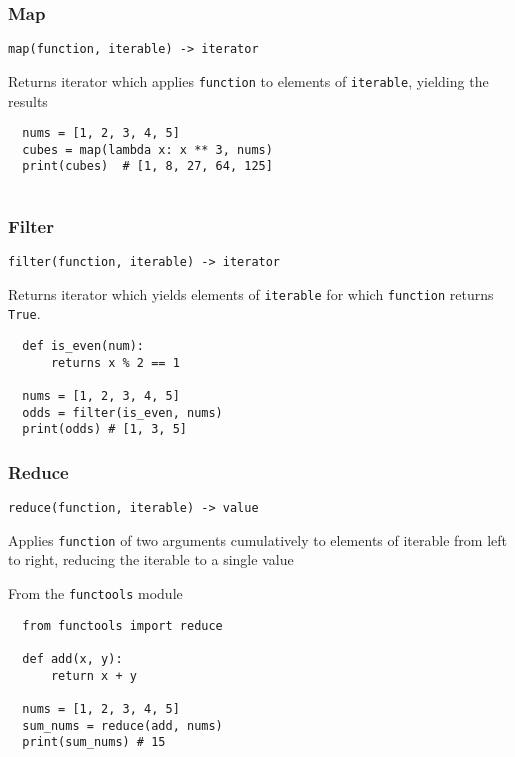 \documentclass[10pt]{beamer}
\begin{document}
\begin{frame}[fragile]
  \frametitle{Map}
  
  \texttt{map(function, iterable) -> iterator}
  
  Returns iterator which applies \texttt{function} to elements of \texttt{iterable}, yielding the results
    
  \begin{verbatim}
  nums = [1, 2, 3, 4, 5]
  cubes = map(lambda x: x ** 3, nums)
  print(cubes)  # [1, 8, 27, 64, 125]
               
  \end{verbatim}           
  
\end{frame}

\begin{frame}[fragile]
  \frametitle{Filter}
  \texttt{filter(function, iterable) -> iterator}
  
  Returns iterator which yields elements of \texttt{iterable} for which \texttt{function}
  returns \texttt{True}.

    
  \begin{verbatim}
  def is_even(num):
      returns x % 2 == 1
      
  nums = [1, 2, 3, 4, 5]
  odds = filter(is_even, nums)
  print(odds) # [1, 3, 5]            
  \end{verbatim}           
  
\end{frame}

\begin{frame}[fragile]
  \frametitle{Reduce}
  \texttt{reduce(function, iterable) -> value}
  
  Applies \texttt{function} of two arguments cumulatively to elements of 
  iterable from left to right, reducing the iterable to a single value
  
  From the \texttt{functools} module    
  \begin{verbatim}
  from functools import reduce
            
  def add(x, y):
      return x + y
      
  nums = [1, 2, 3, 4, 5]
  sum_nums = reduce(add, nums)
  print(sum_nums) # 15            
  \end{verbatim}           
  
\end{frame}
\end{document}
